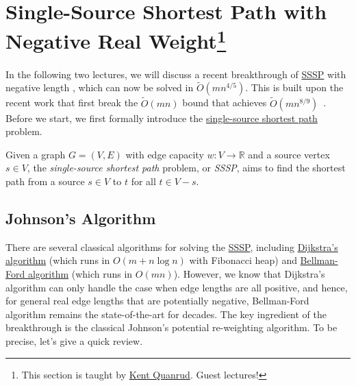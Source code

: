 \section[Single-Source Shortest Path with Negative Real Weight]{Single-Source Shortest Path with Negative Real Weight\protect\footnote{This section is taught by \href{https://kentquanrud.com/}{Kent Quanrud}. Guest lectures!}}
In the following two lectures, we will discuss a recent breakthrough of \hyperref[prb:SSSP]{SSSP} with negative length \cite{huang2024fastersinglesourceshortestpaths}, which can now be solved in \(\widetilde{O} (mn^{4 / 5})\). This is built upon the recent work that first break the \(\widetilde{O} (mn)\) bound that achieves \(\widetilde{O} (mn^{8 / 9})\)~\cite{fineman2024single}. Before we start, we first formally introduce the \hyperref[prb:SSSP]{single-source shortest path} problem.

\begin{problem}\label{prb:SSSP}
Given a graph \(G = (V, E)\) with edge capacity \(w\colon V \to \mathbb{R} \) and a source vertex \(s \in V\), the \emph{single-source shortest path} problem, or \emph{SSSP}, aims to find the shortest path from a source \(s \in V\) to \(t\) for all \(t \in V - s\).
\end{problem}

\subsection{Johnson's Algorithm}
There are several classical algorithms for solving the \hyperref[prb:SSSP]{SSSP}, including \href{https://en.wikipedia.org/wiki/Dijkstra%27s_algorithm}{Dijkstra's algorithm} (which runs in \(O(m + n \log n)\) with Fibonacci heap) and \href{https://en.wikipedia.org/wiki/Bellman%E2%80%93Ford_algorithm}{Bellman-Ford algorithm} (which runs in \(O(mn)\)). However, we know that Dijkstra's algorithm can only handle the case when edge lengths are all positive, and hence, for general real edge lengths that are potentially negative, Bellman-Ford algorithm remains the state-of-the-art for decades. The key ingredient of the breakthrough is the classical Johnson's potential re-weighting algorithm. To be precise, let's give a quick review.

